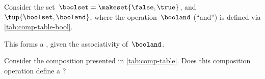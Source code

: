 \begin{example}[Booleans]
    \label{exa:booleans-table}
    \label{ex:bool_semigroup}
    Consider the set~$\boolset=\makeset{\false, \true}$, and~$\tup{\boolset,\booland}$, where the operation~$\booland$ (``and'') is defined via \cref{tab:comp-table-bool}.

    This forms a , given the associativity of~$\booland$.
\end{example}

\begin{gradedexercise}
    \label{ex:CompositionTable}
    Consider the composition presented in \cref{tab:comp-table}.
    Does this composition operation define a ?
\end{gradedexercise}

